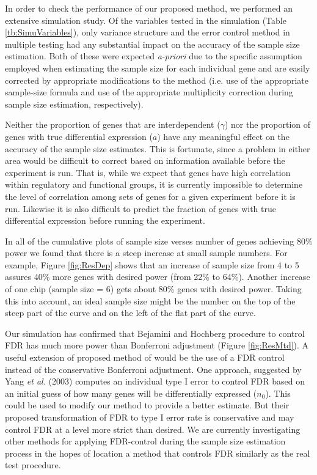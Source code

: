 \documentclass{bioinfo}
\begin{document}
In order to check the performance of our proposed method, we
performed an extensive simulation study. Of the variables tested
in the simulation (Table \ref{tb:SimuVariables}), only variance
structure and the error control method in multiple testing had any
substantial impact on the accuracy of the sample size estimation.
Both of these were expected \textit{a-priori }due to the specific
assumption employed when estimating the sample size for each
individual gene and are easily corrected by appropriate
modifications to the method (i.e. use of the appropriate
sample-size formula and use of the appropriate multiplicity
correction during sample size estimation, respectively).

Neither the proportion of genes that are interdependent ($\gamma$)
nor the proportion of genes with true differential expression
($a$) have any meaningful effect on the accuracy of the sample
size estimates.  This is fortunate, since a problem in either area
would be difficult to correct based on information available
before the experiment is run.  That is, while we expect that genes
have high correlation within regulatory and functional groups, it
is currently impossible to determine the level of correlation
among sets of genes for a given experiment before it is run.
Likewise it is also difficult to predict the fraction of genes
with true differential expression before running the experiment.

In all of the cumulative plots of sample size verses number of
genes achieving 80\% power we found that there is a steep increase
at small sample numbers. For example, Figure \ref{fig:ResDep}
shows that an increase of sample size from 4 to 5 assures 40\%
more genes with desired power (from 22\% to 64\%).  Another
increase of one chip (sample size = 6) gets about 80\% genes with
desired power. Taking this into account, an ideal sample size
might be the number on the top of the steep part of the curve and
on the left of the flat part of the curve.

Our simulation has confirmed that Bejamini and Hochberg procedure
to control FDR has much more power than Bonferroni adjustment
(Figure \ref{fig:ResMtd}). A useful extension of proposed method
of would be the use of a FDR control instead of the conservative
Bonferroni adjustment. One approach, suggested by Yang \textit{et
al.} (2003) computes an individual type I error to control FDR
based on an initial guess of how many genes will be differentially
expressed ($n_0$). This could be used to modify our method to
provide a better estimate. But their proposed transformation of
FDR to type I error rate is conservative and may control FDR at a
level more strict than desired. We are currently investigating
other methods for applying FDR-control during the sample size
estimation process in the hopes of location a method that controls
FDR similarly as the real test procedure.
\end{document}
